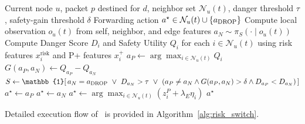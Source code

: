 \begin{algorithm}[t]
\caption{\method\ Decentralized Next-Hop Forwarding Decision}
\label{alg:risk_switch}
\begin{algorithmic}[1]
\Require Current node $u$, packet $p$ destined for $d$, neighbor set $\mathcal{N}_u(t)$, danger threshold $\tau$, safety-gain threshold $\delta$
\Ensure Forwarding action $a^\star \in \mathcal{N}_u(t) \cup \{a_{\mathrm{DROP}}\}$
\State Compute local observation $o_u(t)$ from self, neighbor, and edge features
\State $a_N \sim \pi_S(\cdot \mid o_u(t))$ 
\State Compute Danger Score $D_i$ and Safety Utility $Q_i$ for each $i \in \mathcal{N}_u(t)$ using risk features $x_i^{\mathrm{risk}}$ and P+ features $x_i^{+}$
\State $a_P \gets \arg\max_{i \in \mathcal{N}_u(t)} Q_i$ 
\State $G(a_P, a_N) \gets Q_{a_P} - Q_{a_N}$
\State $S \gets \mathbb{1}[\, a_N = \dropact \ \lor\ D_{a_N} > \tau \ \lor\ (a_P \neq a_N \land G(a_P,a_N) > \delta \land D_{a_P} < D_{a_N}) \,]$
 
    \State $a^\star \gets a_P$
\Else
    \State $a^\star \gets a_N$
\EndIf
{} 
    \State $a^\star \gets \arg\max_{i \in \mathcal{N}_u(t)} \left(z_i^{P} + \lambda_E \eta_i\right)$ 
\EndIf
\State \Return $a^\star$
\end{algorithmic}
\end{algorithm}

Detailed execution flow of \method\ is provided in Algorithm~\ref{alg:risk_switch}.

